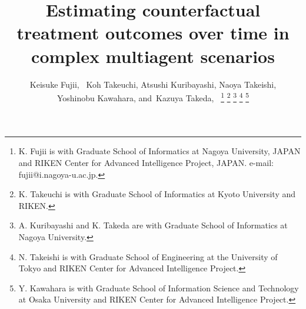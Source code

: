 \documentclass[journal]{IEEEtran}
\begin{document}
%
\title{Estimating counterfactual treatment outcomes over time in complex multiagent scenarios}
%
%
%

\author{Keisuke Fujii,~
        Koh Takeuchi, 
        Atsushi Kuribayashi,
        Naoya Takeishi,\\
        Yoshinobu Kawahara,
        and~Kazuya Takeda,~%
\thanks{K. Fujii is with Graduate School of Informatics at Nagoya University, JAPAN and RIKEN Center for Advanced Intelligence Project, JAPAN. e-mail: fujii@i.nagoya-u.ac.jp.}%
\thanks{K. Takeuchi is with Graduate School of Informatics at Kyoto University and RIKEN.}
\thanks{A. Kuribayashi and K. Takeda are with Graduate School of Informatics at Nagoya University.}%
\thanks{N. Takeishi is with Graduate School of Engineering at the University of Tokyo and RIKEN Center for Advanced Intelligence Project.}
\thanks{Y. Kawahara is with Graduate School of Information Science and Technology at Osaka University and RIKEN Center for Advanced Intelligence Project.}}

% 
%
\end{document}
